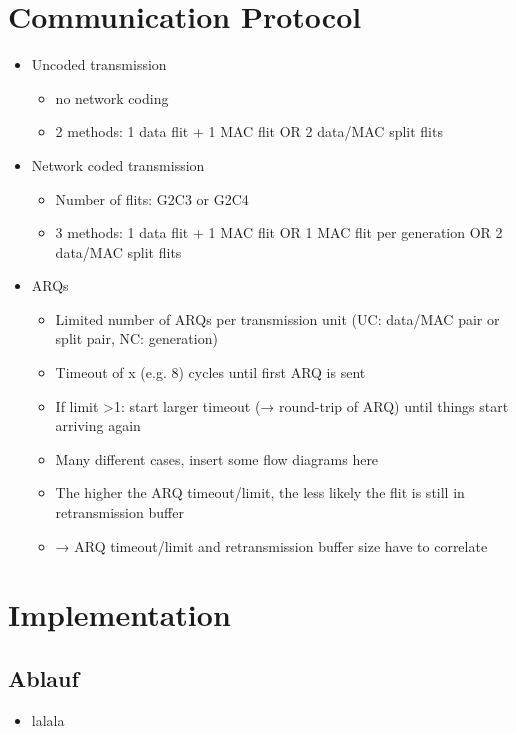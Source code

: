 \documentclass[
	paper=a4,
	fontsize=11pt,
	parskip=full %
]{scrreprt}
\begin{document}
    \chapter{Communication Protocol}
    \begin{itemize}
        \item Uncoded transmission
            \begin{itemize}
                \item no network coding
                \item 2 methods: 1 data flit + 1 MAC flit OR 2 data/MAC split flits
            \end{itemize}
        \item Network coded transmission
            \begin{itemize}
                \item Number of flits: G2C3 or G2C4
                \item 3 methods: 1 data flit + 1 MAC flit OR 1 MAC flit per generation OR 2 data/MAC split flits
            \end{itemize}
        \item ARQs
            \begin{itemize}
                \item Limited number of ARQs per transmission unit (UC: data/MAC pair or split pair, NC: generation)
                \item Timeout of x (e.g. 8) cycles until first ARQ is sent
                \item If limit >1: start larger timeout (→ round-trip of ARQ) until things start arriving again
                \item Many different cases, insert some flow diagrams here
                \item The higher the ARQ timeout/limit, the less likely the flit is still in retransmission buffer
                \item → ARQ timeout/limit and retransmission buffer size have to correlate
            \end{itemize}
    \end{itemize}

    \chapter{Implementation}
    \section{Ablauf}
    \begin{itemize}
        \item lalala
    \end{itemize}
\end{document}
